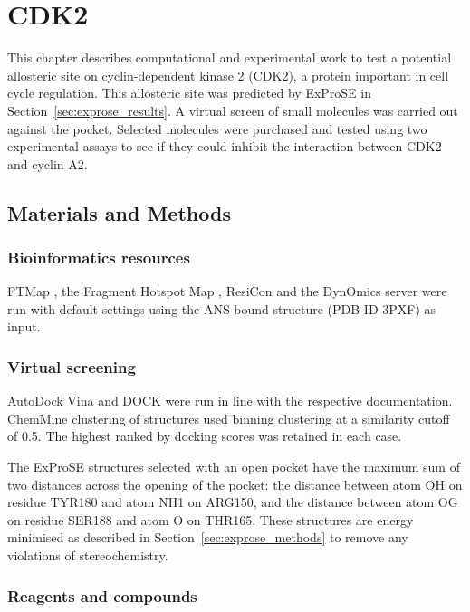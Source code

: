 \chapter{CDK2}
\label{cha:cdk2}

This chapter describes computational and experimental work to test a potential allosteric site on cyclin-dependent kinase 2 (CDK2), a protein important in cell cycle regulation.
This allosteric site was predicted by ExProSE in Section~\ref{sec:exprose_results}.
A virtual screen of small molecules was carried out against the pocket.
Selected molecules were purchased and tested using two experimental assays to see if they could inhibit the interaction between CDK2 and cyclin A2.


\section{Materials and Methods}
\label{sec:cdk2_methods}


\subsection{Bioinformatics resources}

FTMap \cite{Kozakov2015}, the Fragment Hotspot Map \cite{Radoux2016}, ResiCon \cite{Dziubinski2016} and the DynOmics server \cite{Li2017} were run with default settings using the ANS-bound structure (PDB ID 3PXF) as input.


\subsection{Virtual screening}

AutoDock Vina and DOCK were run in line with the respective documentation.
ChemMine clustering of structures used binning clustering at a similarity cutoff of 0.5.
The highest ranked by docking scores was retained in each case.

The ExProSE structures selected with an open pocket have the maximum sum of two distances across the opening of the pocket: the distance between atom OH on residue TYR180 and atom NH1 on ARG150, and the distance between atom OG on residue SER188 and atom O on THR165.
These structures are energy minimised as described in Section~\ref{sec:exprose_methods} to remove any violations of stereochemistry.


\subsection{Reagents and compounds}

